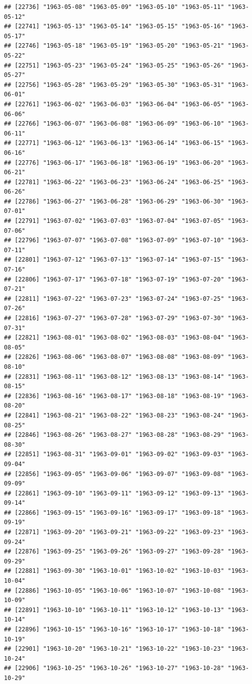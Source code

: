 \documentclass{article}\usepackage[]{graphicx}\usepackage[]{color}
\makeatletter
\newenvironment{kframe}{%
 \def\at@end@of@kframe{}%
 \ifinner\ifhmode%
  \def\at@end@of@kframe{\end{minipage}}%
  \begin{minipage}{\columnwidth}%
 \fi\fi%
 \def\FrameCommand##1{\hskip\@totalleftmargin \hskip-\fboxsep
 \colorbox{shadecolor}{##1}\hskip-\fboxsep
     \hskip-\linewidth \hskip-\@totalleftmargin \hskip\columnwidth}%
 \MakeFramed {\advance\hsize-\width
   \@totalleftmargin\z@ \linewidth\hsize
   \@setminipage}}%
 {\par\unskip\endMakeFramed%
 \at@end@of@kframe}
\newenvironment{knitrout}{}{} %
\makeatother
\begin{document}
\begin{description}
\begin{knitrout}
\begin{kframe}
\begin{verbatim}
## [22736] "1963-05-08" "1963-05-09" "1963-05-10" "1963-05-11" "1963-05-12"
## [22741] "1963-05-13" "1963-05-14" "1963-05-15" "1963-05-16" "1963-05-17"
## [22746] "1963-05-18" "1963-05-19" "1963-05-20" "1963-05-21" "1963-05-22"
## [22751] "1963-05-23" "1963-05-24" "1963-05-25" "1963-05-26" "1963-05-27"
## [22756] "1963-05-28" "1963-05-29" "1963-05-30" "1963-05-31" "1963-06-01"
## [22761] "1963-06-02" "1963-06-03" "1963-06-04" "1963-06-05" "1963-06-06"
## [22766] "1963-06-07" "1963-06-08" "1963-06-09" "1963-06-10" "1963-06-11"
## [22771] "1963-06-12" "1963-06-13" "1963-06-14" "1963-06-15" "1963-06-16"
## [22776] "1963-06-17" "1963-06-18" "1963-06-19" "1963-06-20" "1963-06-21"
## [22781] "1963-06-22" "1963-06-23" "1963-06-24" "1963-06-25" "1963-06-26"
## [22786] "1963-06-27" "1963-06-28" "1963-06-29" "1963-06-30" "1963-07-01"
## [22791] "1963-07-02" "1963-07-03" "1963-07-04" "1963-07-05" "1963-07-06"
## [22796] "1963-07-07" "1963-07-08" "1963-07-09" "1963-07-10" "1963-07-11"
## [22801] "1963-07-12" "1963-07-13" "1963-07-14" "1963-07-15" "1963-07-16"
## [22806] "1963-07-17" "1963-07-18" "1963-07-19" "1963-07-20" "1963-07-21"
## [22811] "1963-07-22" "1963-07-23" "1963-07-24" "1963-07-25" "1963-07-26"
## [22816] "1963-07-27" "1963-07-28" "1963-07-29" "1963-07-30" "1963-07-31"
## [22821] "1963-08-01" "1963-08-02" "1963-08-03" "1963-08-04" "1963-08-05"
## [22826] "1963-08-06" "1963-08-07" "1963-08-08" "1963-08-09" "1963-08-10"
## [22831] "1963-08-11" "1963-08-12" "1963-08-13" "1963-08-14" "1963-08-15"
## [22836] "1963-08-16" "1963-08-17" "1963-08-18" "1963-08-19" "1963-08-20"
## [22841] "1963-08-21" "1963-08-22" "1963-08-23" "1963-08-24" "1963-08-25"
## [22846] "1963-08-26" "1963-08-27" "1963-08-28" "1963-08-29" "1963-08-30"
## [22851] "1963-08-31" "1963-09-01" "1963-09-02" "1963-09-03" "1963-09-04"
## [22856] "1963-09-05" "1963-09-06" "1963-09-07" "1963-09-08" "1963-09-09"
## [22861] "1963-09-10" "1963-09-11" "1963-09-12" "1963-09-13" "1963-09-14"
## [22866] "1963-09-15" "1963-09-16" "1963-09-17" "1963-09-18" "1963-09-19"
## [22871] "1963-09-20" "1963-09-21" "1963-09-22" "1963-09-23" "1963-09-24"
## [22876] "1963-09-25" "1963-09-26" "1963-09-27" "1963-09-28" "1963-09-29"
## [22881] "1963-09-30" "1963-10-01" "1963-10-02" "1963-10-03" "1963-10-04"
## [22886] "1963-10-05" "1963-10-06" "1963-10-07" "1963-10-08" "1963-10-09"
## [22891] "1963-10-10" "1963-10-11" "1963-10-12" "1963-10-13" "1963-10-14"
## [22896] "1963-10-15" "1963-10-16" "1963-10-17" "1963-10-18" "1963-10-19"
## [22901] "1963-10-20" "1963-10-21" "1963-10-22" "1963-10-23" "1963-10-24"
## [22906] "1963-10-25" "1963-10-26" "1963-10-27" "1963-10-28" "1963-10-29"

\end{verbatim}
\end{kframe}
\end{knitrout}
\end{description}
\end{document}
